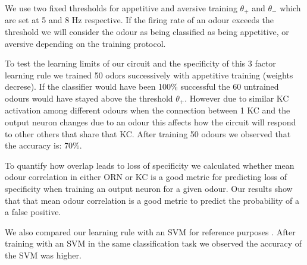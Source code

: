 \item We use two fixed thresholds for appetitive and aversive training $\theta_{+}$ and $\theta_{-}$ which are set at 5 and 8 Hz respective.
If the firing rate of an odour exceeds the threshold we will consider the odour as being classified as being appetitive, or aversive depending on the training protocol. 

\item To test the learning limits of our circuit and the specificity of this 3 factor learning rule we trained 50 odors successively with appetitive training (weights decrese). If the classifier would have been 100\% successful the 60 untrained odours would have stayed above the threshold $\theta_{+}$. However due to similar KC activation among different odours when the connection between 1 KC and the output neuron changes due to an odour this affects how the circuit will respond to other others that share that KC. 
After training 50 odours we observed that the accuracy is: 70\%.



\item To quantify how overlap leads to loss of specificity we calculated whether mean odour correlation in either ORN or KC is a good metric for predicting loss of specificity when training an output neuron for a given odour. Our results show that that mean odour correlation is a good metric to predict the probability of a a false positive. 

\item We also compared our learning rule with an SVM for reference purposes . After training with an SVM in the same classification task we observed the accuracy of the SVM was higher. 
  
  
  
  
  
  
  
  
  
  
  
  